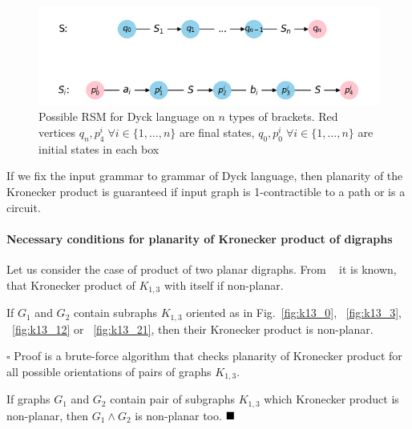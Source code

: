 \begin{figure}[h]

  \begin{center}  
  \includegraphics[scale = 0.4]{dyck_n.png}
  \end{center}

  \caption{Possible RSM for Dyck language on $n$ types of brackets. Red vertices $q_n, p^i_4 \; \forall i \in \{1, \ldots, n\}$  are final states, $q_0, p^i_0 \; \forall i \in \{1, \ldots, n\}$ are initial states in each box}

  \label{fig:dyck_n}

\end{figure}

\begin{corollary}
\label{cor:path_circuit}
If we fix the input grammar to grammar of Dyck language, then planarity of the Kronecker product is guaranteed if input graph is 1-contractible to a path or is a circuit.
\end{corollary}

\paragraph{Necessary conditions for planarity of Kronecker product of digraphs}

Let us consider the case of product of two planar digraphs. From ~\citep{farzan1977kronecker} it is known, that Kronecker product of $K_{1, 3}$ with itself if non-planar.

\begin{proposition}
If $G_1$ and $G_2$ contain subraphs $K_{1, 3}$ oriented as in Fig.~\ref{fig:k13_0}, ~\ref{fig:k13_3}, ~\ref{fig:k13_12} or ~\ref{fig:k13_21}, then their Kronecker product is non-planar. 
\end{proposition}

$\square$
Proof is a brute-force algorithm that checks planarity of Kronecker product for all possible orientations of pairs of graphs $K_{1, 3}$.

If graphs $G_1$ and $G_2$ contain pair of subgraphs $K_{1, 3}$ which Kronecker product is non-planar, then $G_1 \wedge G_2$ is non-planar too.
$\hfill\blacksquare$

